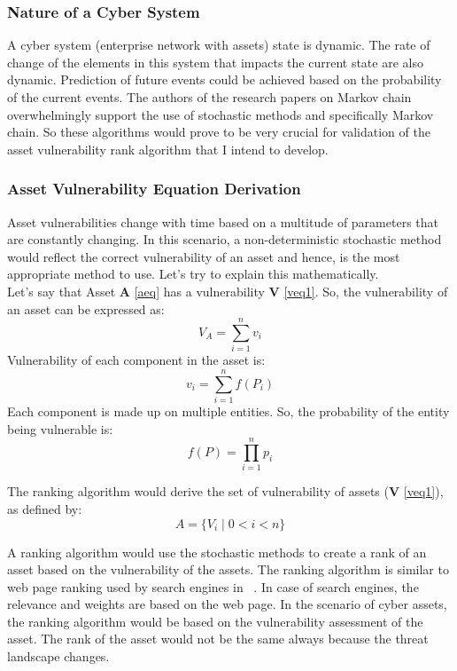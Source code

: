 \subsubsection{Nature of a Cyber System}\label{sec:cyber_nature}
A cyber system (enterprise network with assets) state is dynamic. The rate of change of the elements in this system that impacts the current state are also dynamic. Prediction of future events could be achieved based on the probability of the current events. The authors of the research papers on Markov chain overwhelmingly support the use of stochastic methods and specifically Markov chain. So these algorithms would prove to be very crucial for validation of the asset vulnerability rank algorithm that I intend to develop.

\subsubsection{Asset Vulnerability Equation Derivation}\label{sec:stochs}
Asset vulnerabilities change with time based on a multitude of parameters that are constantly changing. In this scenario, a non-deterministic stochastic method would reflect the correct vulnerability of an asset and hence, is the most appropriate method to use. Let's try to explain this mathematically.\\ 
\noindent Let's say that Asset \textbf{A} \eqref{aeq}  has a vulnerability \textbf{V} \eqref{veq1}.
\noindent So, the vulnerability of an asset can be expressed as:
\begin{equation}\label{veq1}
      V_A = \sum_{i=1}^{n} v_i
\end{equation}
\noindent Vulnerability of each component in the asset is:
\begin{equation}\label{veq2}
         v_i = \sum_{i=1}^{n} f(P_i)
\end{equation}
\noindent Each component is made up on multiple entities. So, the probability of the entity being vulnerable is:
\begin{equation}\label{veq3}
        f(P) =\prod_{i=1}^n p_{i}
\end{equation}

\noindent The ranking algorithm would derive the set of vulnerability of assets (\textbf{V} \eqref{veq1}), as defined by:
\begin{equation}\label{aeq}
        A=\{V_i\mid 0 < i < n\}
\end{equation}

A ranking algorithm would use the stochastic methods to create a rank of an asset based on the vulnerability of the assets. The ranking algorithm is similar to web page ranking used by search engines in ~\cite{Pageetal98}. In case of search engines, the relevance and weights are based on the web page. In the scenario of cyber assets, the ranking algorithm would be based on the vulnerability assessment of the asset. The rank of the asset would not be the same always because the threat landscape changes.

